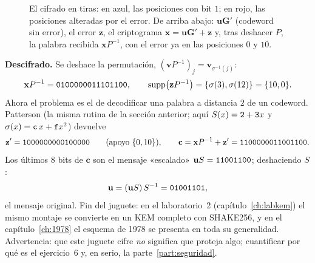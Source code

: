 \documentclass[11pt,a4paper,oneside]{report}
\newcommand{\supp}{\operatorname{supp}}
\newcommand{\Gmat}{\mathbf{G}}          %
\newcommand{\vx}{\mathbf{x}}
\newcommand{\vc}{\mathbf{c}}
\newcommand{\vu}{\mathbf{u}}
\newcommand{\vz}{\mathbf{z}}
\newcommand{\vv}{\mathbf{v}}
\newcommand{\hx}[1]{\text{\texttt{#1}}}
\begin{document}
\begin{figure}[htbp]
\centering
{}
\caption{El cifrado en tiras: en azul, las posiciones con bit $1$; en
rojo, las posiciones alteradas por el error. De arriba abajo:
$\vu\Gmat'$ (codeword sin error), el error $\vz$, el criptograma
$\vx=\vu\Gmat'+\vz$ y, tras deshacer $P$, la palabra recibida
$\vx P^{-1}$, con el error ya en las posiciones $0$ y $10$.}
\label{fig:lab-cifrado}
\end{figure}

\textbf{Descifrado.} Se deshace la permutación,
$(\vv P^{-1})_j=\vv_{\sigma^{-1}(j)}$:
\[
\vx P^{-1}=\hx{0100000011101100},
\qquad
\supp\bigl(\vz P^{-1}\bigr)=\{\sigma(3),\sigma(12)\}=\{10,0\}.
\]
Ahora el problema es el de decodificar una palabra a distancia $2$ de un
codeword. Patterson (la misma rutina de la
sección anterior; aquí $S(x)=\hx2+\hx3x$ y $\sigma(x)=\hx c\,x+\hx f
x^2$) devuelve
\[
\vz'=\hx{1000000000100000}\qquad(\text{apoyo }\{0,10\}),
\qquad
\vc=\vx P^{-1}+\vz'=\hx{1100000011001100}.
\]
Los últimos $8$ bits de $\vc$ son el mensaje «escalado»
$\vu S=\hx{11001100}$; deshaciendo $S$:
\[
\vu=(\vu S)\,S^{-1}=\hx{01001101},
\]
el mensaje original. Fin del juguete: en el
laboratorio~2 (capítulo~\ref{ch:labkem}) el mismo montaje se convierte
en un KEM completo con SHAKE256, y en el capítulo~\ref{ch:1978} el
esquema de 1978 se presenta en toda su generalidad. Advertencia: que
este juguete cifre \emph{no} significa que proteja algo; cuantificar por
qué es el ejercicio~6 y, en serio, la
parte~\ref{part:seguridad}.
\end{document}
